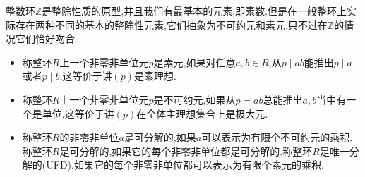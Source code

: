 整数环$\mathbb{Z}$是整除性质的原型,并且我们有最基本的元素,即素数.但是在一般整环上实际存在两种不同的基本的整除性元素,它们抽象为不可约元和素元.只不过在$\mathbb{Z}$的情况它们恰好吻合.
\begin{itemize}
	\item 称整环$R$上一个非零非单位元$p$是素元,如果对任意$a,b\in R$,从$p\mid ab$能推出$p\mid a$或者$p\mid b$,这等价于讲$(p)$是素理想.
	\item 称整环$R$上一个非零非单位元$p$是不可约元,如果从$p=ab$总能推出$a,b$当中有一个是单位.这等价于讲$(p)$在全体主理想集合上是极大元.
	\item 称整环$R$的非零非单位$a$是可分解的,如果$a$可以表示为有限个不可约元的乘积.称整环$R$是可分解的,如果它的每个非零非单位都是可分解的.称整环$R$是唯一分解的(UFD),如果它的每个非零非单位都可以表示为有限个素元的乘积.
\end{itemize}
